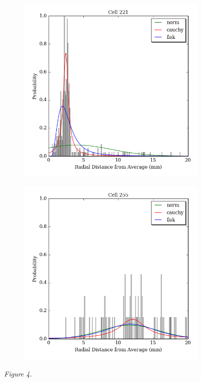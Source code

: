 \documentclass[12pt]{article}
\begin{document}
\begin{figure}
\medskip
\centering
\begin{subfigure}{.5\textwidth}
  \centering
  \includegraphics[width=\linewidth]{../figures/cellfigs/probdens221.png}
  \label{fig:sub1}
\end{subfigure}%
\begin{subfigure}{.5\textwidth}
  \centering
  \includegraphics[width=\linewidth]{../figures/cellfigs/probdens255.png}
  \label{fig:sub2}
\end{subfigure}
\label{fig:test}
\textit{Figure 4.} 
\end{figure}
\end{document}
